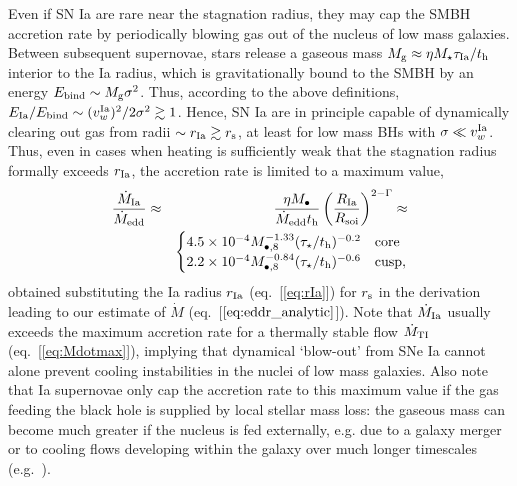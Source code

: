\documentclass[usenatbib,fleqn]{mn2e}
\newcommand{\Mbheight}{M_{\bullet,8}}
\begin{document}
Even if SN Ia are rare near the stagnation radius, they may cap the
SMBH accretion rate by periodically blowing gas out of the nucleus of
low mass galaxies.  Between subsequent supernovae, stars release a
gaseous mass $M_{\rm g} \approx \eta M_{\star}\tau_{\rm Ia}/t_{\rm h}$
interior to the Ia radius, which is gravitationally bound to the SMBH
by an energy $E_{\rm bind} \sim M_{\rm g}\sigma^{2}$.  Thus, according
to the above definitions, $E_{\rm Ia}/E_{\rm bind} \sim (v_{w}^{\rm
  Ia})^{2}/2\sigma^{2} \gtrsim 1$.  Hence, SN Ia are in principle
capable of dynamically clearing out gas from radii $\sim r_{\rm Ia}
\gtrsim r_{\rm s}$, at least for low mass BHs with $\sigma \ll v^{\rm
  Ia}_{w}$.  Thus, even in cases when heating is sufficiently weak
that the stagnation radius formally exceeds $r_{\rm Ia}$, the
accretion rate is limited to a maximum value,
\begin{eqnarray}
\frac{\dot{M}_{\rm Ia}}{\dot{M}_{\rm edd}} &\approx& \frac{\eta M_{\bullet}}{\dot{M}_{\rm edd} t_{\rm h}}\left(\frac{R_{\rm Ia}}{R_{\rm soi}}\right)^{2-\Gamma} \approx \nonumber \\
 && \begin{cases}
    4.5 \times 10^{-4} M_{\bullet,8}^{-1.33}(\tau_{\star}/t_{\rm h})^{-0.2}
   & \text{core} \\
    2.2 \times 10^{-4} \Mbheight^{-0.84}(\tau_{\star}/t_{\rm h})^{-0.6}   & \text{cusp},
  \end{cases}
  \label{eq:eddr_Ia}
\end{eqnarray}
obtained substituting the Ia radius $r_{\rm Ia}$ (eq.~[\ref{eq:rIa}]) for $r_{\rm s}$ in the derivation leading to our estimate of $\dot{M}$ (eq.~[$\ref{eq:eddr_analytic}$]).  Note that $\dot{M}_{\rm Ia}$ usually exceeds the maximum accretion rate for a thermally stable flow $\dot{M}_{\rm TI}$ (eq.~[\ref{eq:Mdotmax}]), implying that dynamical `blow-out' from SNe Ia cannot alone prevent cooling instabilities in the nuclei of low mass galaxies.  Also note that Ia supernovae only cap the accretion rate to this maximum value if the gas feeding the black hole is supplied by local stellar mass loss: the gaseous mass can become much greater if the nucleus is fed externally, e.g. due to a galaxy merger or to cooling flows developing within the galaxy over much longer timescales (e.g.~\citealt{Ciotti&Ostriker07}). 
\end{document}
